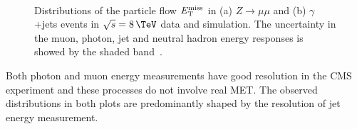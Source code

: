 \begin{figure}[!htp]%
\centering
{}\qquad
{}\\
\caption[Distributions of the particle flow $\MET$ in $Z\rightarrow\mu\mu$ and $\gamma$+jets events in $\sqrt{s}=8\,\TeV$ data and simulation.]
{Distributions of the particle flow $\MET$ in (a) $Z\rightarrow\mu\mu$ and (b) $\gamma$+jets events in $\sqrt{s}=8\,\TeV$ data and simulation. The uncertainty in the muon, photon, jet and neutral hadron energy responses is showed by the shaded band~\cite{ARTICLE:CMSMETPerformance8TeV}.}
\label{FIGURE:EventReconstructionAndSimulation_METDistributionZmumu}
\end{figure}

Both photon and muon energy measurements have good resolution in the \gls{CMS} experiment and these processes do not involve real \gls{MET}. The observed distributions in both plots are predominantly shaped by the resolution of jet energy measurement.

